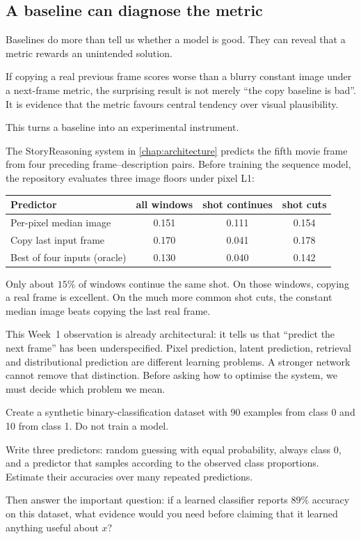 \subsection{A baseline can diagnose the metric}

Baselines do more than tell us whether a model is good. They can reveal that a metric rewards an unintended solution.

If copying a real previous frame scores worse than a blurry constant image under a next-frame metric, the surprising result is not merely ``the copy baseline is bad''. It is evidence that the metric favours central tendency over visual plausibility.

This turns a baseline into an experimental instrument.

\begin{architecturebox}
The StoryReasoning system in \cref{chap:architecture} predicts the fifth movie frame from four preceding frame--description pairs. Before training the sequence model, the repository evaluates three image floors under pixel L1:

\begin{center}
\begin{tabular}{lccc}
\toprule
Predictor & all windows & shot continues & shot cuts \\
\midrule
Per-pixel median image & 0.151 & 0.111 & 0.154 \\
Copy last input frame & 0.170 & 0.041 & 0.178 \\
Best of four inputs (oracle) & 0.130 & 0.040 & 0.142 \\
\bottomrule
\end{tabular}
\end{center}

Only about \(15\%\) of windows continue the same shot. On those windows, copying a real frame is excellent. On the much more common shot cuts, the constant median image beats copying the last real frame.

This Week~1 observation is already architectural: it tells us that ``predict the next frame'' has been underspecified. Pixel prediction, latent prediction, retrieval and distributional prediction are different learning problems. A stronger network cannot remove that distinction. Before asking how to optimise the system, we must decide which problem we mean.
\end{architecturebox}

\begin{optionalexercise}[title={Optional coding --- a baseline before a model}]
Create a synthetic binary-classification dataset with 90 examples from class 0 and 10 from class 1. Do not train a model.

Write three predictors: random guessing with equal probability, always class 0, and a predictor that samples according to the observed class proportions. Estimate their accuracies over many repeated predictions.

Then answer the important question: if a learned classifier reports \(89\%\) accuracy on this dataset, what evidence would you need before claiming that it learned anything useful about \(x\)?
\end{optionalexercise}


